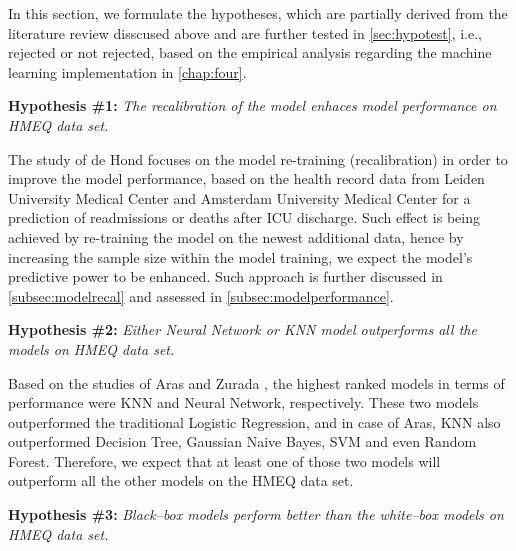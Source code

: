 In this section, we formulate the hypotheses, which are partially derived from the literature review disscused above and are further tested in \autoref{sec:hypotest}, i.e., rejected or not rejected, based on the empirical analysis regarding the machine learning implementation in \autoref{chap:four}.
\vspace{0.5cm}

\noindent \textbf{Hypothesis \#1:} \textit{The recalibration of the model enhaces model performance on HMEQ data set.}

The study of de Hond \citep{de2023predicting} focuses on the model re-training (recalibration) in order to improve the model performance, based on the health record data from Leiden University Medical Center and Amsterdam University Medical Center for a prediction of readmissions or deaths after ICU discharge.
Such effect is being achieved by re-training the model on the newest additional data, hence by increasing the sample size within the model training, we expect the model's predictive power to be enhanced. Such approach is further discussed in \autoref{subsec:modelrecal} and assessed in \autoref{subsec:modelperformance}.
\vspace{0.5cm}


\noindent \textbf{Hypothesis \#2:} \textit{Either Neural Network or KNN model outperforms all the models on HMEQ data set.}

Based on the studies of Aras \citep{serkan2021bagging} and Zurada \citep{zurada2014classification}, the highest ranked models in terms of performance were KNN and Neural Network, respectively. These two models outperformed the traditional Logistic Regression, and in case of Aras, KNN also outperformed Decision Tree, Gaussian Naive Bayes, SVM and even Random Forest.
Therefore, we expect that at least one of those two models will outperform all the other models on the HMEQ data set.

\vspace{0.5cm}

\noindent \textbf{Hypothesis \#3:} \textit{Black--box models perform better than the white--box models on HMEQ data set.}


